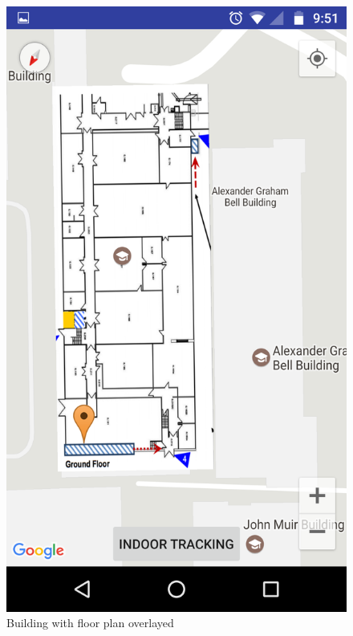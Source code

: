 \documentclass[10.8pt]{article}
\begin{document}
\begin{figure}[H]
\begin{minipage}[b]{.3\textwidth}
        \includegraphics[scale=1.2, width=\linewidth]{pic2.png}  
        \caption{Building with floor plan overlayed}  
    \end{minipage}  
\end{figure}
\end{document}

